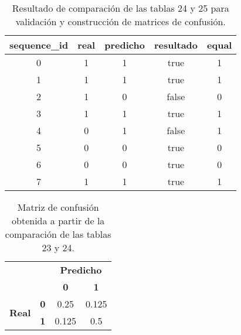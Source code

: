 \begin{table}[]
	\centering
	\begin{tabular}{|c|c|c|c|c|}
		\hline
		\textbf{sequence\_id} & \textbf{real} & \textbf{predicho} & \textbf{resultado} & \textbf{equal} \\ \hline
		0 & 1 & 1 & true  & 1 \\ \hline
		1 & 1 & 1 & true  & 1 \\ \hline
		2 & 1 & 0 & false & 0 \\ \hline
		3 & 1 & 1 & true  & 1 \\ \hline
		4 & 0 & 1 & false & 1 \\ \hline
		5 & 0 & 0 & true  & 0 \\ \hline
		6 & 0 & 0 & true  & 0 \\ \hline
		7 & 1 & 1 & true  & 1 \\ \hline
	\end{tabular}
	\caption{Resultado de comparación de las tablas 24 y 25 para validación y construcción de matrices de confusión.}
	\label{tab:validacion-comparacion}
\end{table}

\begin{table}[]
	\centering
	\begin{tabular}{ll|c|c|}
		\cline{3-4}
		&  & \multicolumn{2}{c|}{\textbf{Predicho}} \\ \cline{3-4}
		&  & \textbf{0}         & \textbf{1}        \\ \hline
		\multicolumn{1}{|c|}{\multirow{2}{*}{\textbf{Real}}} & \multicolumn{1}{c|}{\textbf{0}} & 0.25  & 0.125 \\ \cline{2-4}
		\multicolumn{1}{|c|}{}                               & \multicolumn{1}{c|}{\textbf{1}} & 0.125 & 0.5   \\ \hline
	\end{tabular}
	\caption{Matriz de confusión obtenida a partir de la comparación de las tablas 23 y 24.}
	\label{tab:validacion-confusion-ejemplo}
\end{table}